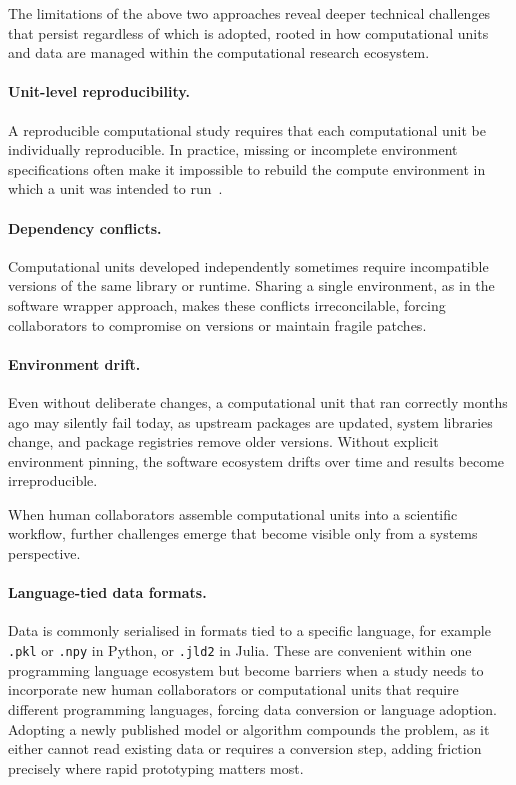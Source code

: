 \documentclass{eceasst}
\begin{document}
\medskip
The limitations of the above two approaches reveal deeper technical challenges
that persist regardless of which is adopted, rooted in how computational units 
and data are managed within the computational research ecosystem.

\paragraph{Unit-level reproducibility.}
A reproducible computational study requires that each computational unit be
individually reproducible. In practice, missing or incomplete environment
specifications often make it impossible to rebuild the compute environment
in which a unit was intended to run~\cite{repro_study}.

\paragraph{Dependency conflicts.}
Computational units developed independently sometimes require incompatible versions of
the same library or runtime. Sharing a single environment, as in the software wrapper approach, makes these
conflicts irreconcilable, forcing collaborators to compromise on versions or
maintain fragile patches.

\paragraph{Environment drift.}
Even without deliberate changes, a computational unit that ran correctly months ago
may silently fail today, as upstream packages are updated, system libraries change,
and package registries remove older versions. Without explicit environment pinning,
the software ecosystem drifts over time and results become irreproducible.

\medskip
When human collaborators assemble computational units into a scientific workflow, further challenges emerge that become visible only from a systems perspective.

\paragraph{Language-tied data formats.}
Data is commonly serialised in formats tied to a specific language, for example
\texttt{.pkl} or \texttt{.npy} in Python, or \texttt{.jld2} in Julia. These are
convenient within one programming language ecosystem but become barriers when a study needs to incorporate new human collaborators or computational units that require different programming languages, forcing data conversion or language adoption. Adopting a newly published model or algorithm compounds
the problem, as it either cannot read existing data or requires a conversion
step, adding friction precisely where rapid prototyping matters most.
\end{document}
